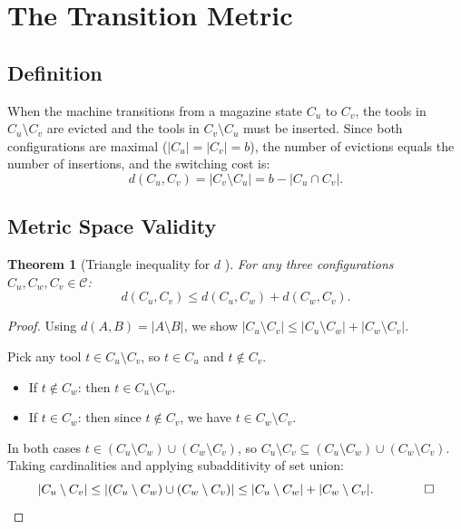 \documentclass[11pt,a4paper]{article}
\theoremstyle{plain}
\newtheorem{theorem}{Theorem}[section]
\theoremstyle{definition}
\begin{document}
\section{The Transition Metric}
\label{sec:metric}

\subsection{Definition}

When the machine transitions from a magazine state $C_u$ to $C_v$, the tools
in $C_u \setminus C_v$ are evicted and the tools in $C_v \setminus C_u$ must
be inserted. Since both configurations are maximal ($|C_u|=|C_v|=b$), the number
of evictions equals the number of insertions, and the switching cost is:
\[
  d(C_u, C_v) = |C_v \setminus C_u| = b - |C_u \cap C_v|.
\]

\subsection{Metric Space Validity}

\begin{thmbox}
\begin{theorem}[Triangle inequality for $d$ \cite{Colares2026Exact}]
\label{thm:triangle}
For any three configurations $C_u, C_w, C_v \in \mathcal{C}$:
\[
  d(C_u, C_v) \le d(C_u, C_w) + d(C_w, C_v).
\]
\end{theorem}
\end{thmbox}

\begin{proofbox}
\begin{proof}
Using $d(A,B) = |A \setminus B|$, we show $|C_u \setminus C_v| \le
|C_u \setminus C_w| + |C_w \setminus C_v|$.

Pick any tool $t \in C_u \setminus C_v$, so $t \in C_u$ and $t \notin C_v$.
\begin{itemize}
\item If $t \notin C_w$: then $t \in C_u \setminus C_w$.
\item If $t \in C_w$: then since $t \notin C_v$, we have $t \in C_w \setminus C_v$.
\end{itemize}
In both cases $t \in (C_u \setminus C_w) \cup (C_w \setminus C_v)$, so
$C_u \setminus C_v \subseteq (C_u \setminus C_w) \cup (C_w \setminus C_v)$.
Taking cardinalities and applying subadditivity of set union:
\[
  |C_u \setminus C_v| \le |(C_u \setminus C_w) \cup (C_w \setminus C_v)|
  \le |C_u \setminus C_w| + |C_w \setminus C_v|. \qquad\qed
\]
\end{proof}
\end{proofbox}
\end{document}
